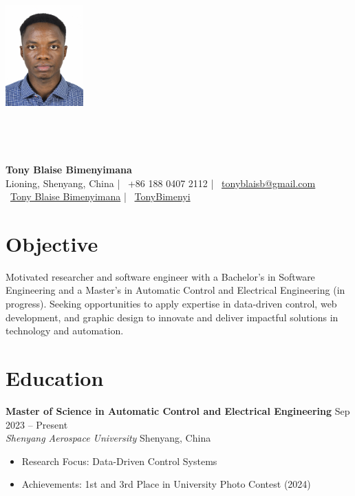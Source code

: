 \documentclass[10pt,letterpaper]{article}
\newcommand{\entry}[4]{\textbf{#1} \hfill #2 \\ \textit{#3} \hfill #4 \\}
\begin{document}
\begin{center}
    \includegraphics[width=3cm, height=8cm, keepaspectratio]{tony.JPG} \\[0.2cm]
    {\Huge \textbf{Tony Blaise Bimenyimana}} \\[0.2cm]
    Lioning, Shenyang, China | \faPhone~+86 188 0407 2112 | \faEnvelope~\href{mailto:tonyblaisb@gmail.com}{tonyblaisb@gmail.com} \\
    \faLinkedin~\href{https://www.linkedin.com/in/tony-blaise-bimenyimana}{Tony Blaise Bimenyimana} | \faGithub~\href{https://github.com/TonyBimenyi}{TonyBimenyi} \\[0.2cm]
\end{center}

\section*{Objective}
Motivated researcher and software engineer with a Bachelor’s in Software Engineering and a Master’s in Automatic Control and Electrical Engineering (in progress). Seeking opportunities to apply expertise in data-driven control, web development, and graphic design to innovate and deliver impactful solutions in technology and automation.

\section*{Education}
\entry{Master of Science in Automatic Control and Electrical Engineering}{Sep 2023 -- Present}
{Shenyang Aerospace University}{Shenyang, China}
\begin{itemize}[leftmargin=*,nosep]
    \item Research Focus: Data-Driven Control Systems
    \item Achievements: 1st and 3rd Place in University Photo Contest (2024)
\end{itemize}
\end{document}
